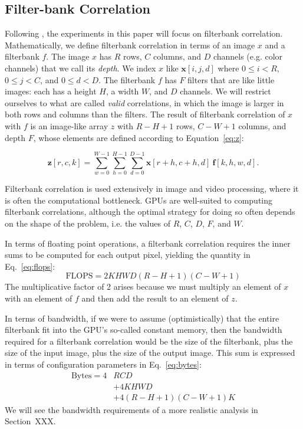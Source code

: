 \documentclass{sig-alternate}
\begin{document}
\cite{volkov+demmel:2008}
\cite{vuduc:2003} %


\subsection{Filter-bank Correlation}

Following \citet{pinto+cox:2011gcg}, the experiments in this paper will focus on filterbank
correlation.  Mathematically, we define filterbank correlation in terms of an
image $x$ and a filterbank $f$.
The image $x$ has $R$ rows, $C$ columns, and $D$ channels (e.g. color
channels) that we call its {\em depth}. We index $x$ like $\mathbf{x}[i,j,d]$
where $0 \leq i < R$, $0 \leq j < C$, and $0 \leq d < D$.
The filterbank $f$ has $F$ filters that are like little images: each has a
height $H$, a width $W$, and $D$ channels.
We will restrict ourselves to what are called {\em valid} correlations, in
which the image is larger in both rows and columns than the filters.
The result of filterbank correlation of $x$ with $f$ is an image-like array
$z$ with $R-H+1$ rows, $C-W+1$ columns, and depth $F$, whose elements are
defined according to Equation~\ref{eq:z}:

\begin{equation}
    \mathbf{z}[r,c,k] = \sum_{w=0}^{W-1} \sum_{h=0}^{H-1} \sum_{d=0}^{D-1}
        \mathbf{x}[r+h, c+h, d]~ \mathbf{f}[k, h, w, d].
        \label{eq:z}
\end{equation}

Filterbank correlation is used extensively in image and video processing,
where it is often the computational bottleneck.
GPUs are well-suited to computing filterbank correlations, although the
optimal strategy for doing so often depends on the shape of the problem, i.e.
the values of $R$, $C$, $D$, $F$, and $W$.

In terms of floating point operations, a filterbank correlation requires the
inner sums to be computed for each output pixel, yielding the quantity in
Eq.~\ref{eq:flops}:
\begin{equation}
\mathrm{FLOPS} = 2  K  H  W  D  (R - H + 1)( C- W + 1)
\label{eq:flops}
\end{equation}
The multiplicative factor of 2 arises because we must multiply an element of
$x$ with an element of $f$ and then add the result to an element of $z$.

In terms of bandwidth, if we were to assume (optimistically) that the entire
filterbank fit into the GPU's so-called constant memory, then the bandwidth
required for a filterbank correlation would be the size of the filterbank,
plus the size of the input image, plus the size of the output image. This sum
is expressed in terms of configuration parameters in Eq.~\ref{eq:bytes}:
\begin{align}
\mathrm{Bytes} = 4&RCD \nonumber \\
& + 4KHWD \nonumber \\
& + 4(R-H+1)(C-W+1)K
\label{eq:bytes}
\end{align}
We will see the bandwidth requirements of a more realistic analysis in
Section~XXX.
\end{document}
